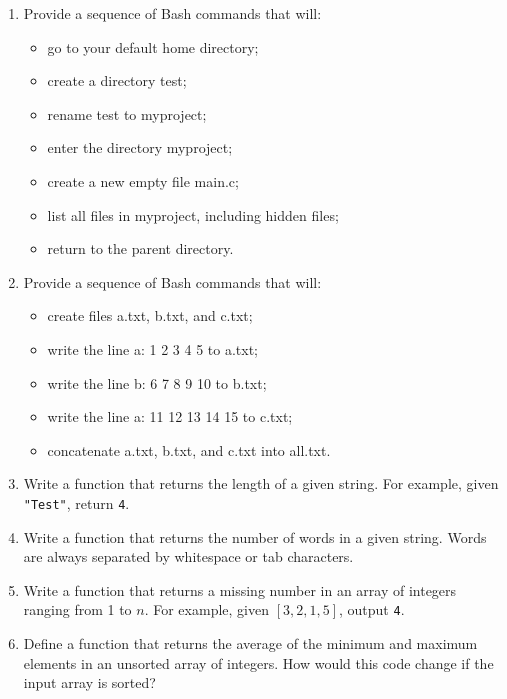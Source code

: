 \documentclass[11pt]{article}
\begin{document}
\begin{enumerate}[leftmargin=*]

\item Provide a sequence of Bash commands that will:
    \begin{itemize}
        \item go to your default home directory;
        \item create a directory test;
        \item rename test to myproject;
        \item enter the directory myproject;
        \item create a new empty file main.c;
        \item list all files in myproject, including hidden files;
        \item return to the parent directory.
    \end{itemize}

\item Provide a sequence of Bash commands that will:
    \begin{itemize}
        \item create files a.txt, b.txt, and c.txt;
        \item write the line a: 1 2 3 4 5 to a.txt;
        \item write the line b: 6 7 8 9 10 to b.txt;
        \item write the line a: 11 12 13 14 15 to c.txt;
        \item concatenate a.txt, b.txt, and c.txt into all.txt.
    \end{itemize}

\item Write a function that returns the length of a given string. For example, given \verb|"Test"|, return \verb|4|.

\item Write a function that returns the number of words in a given string.  Words are always separated by whitespace or tab characters.

\item Write a function that returns a missing number in an array of integers ranging from 1 to $n$. For example, given $[3, 2, 1, 5]$, output \verb|4|.

\item Define a function that returns the average of the minimum and maximum elements in an unsorted array of integers. How would this code change if the input array is sorted?


\end{enumerate}
\end{document}
